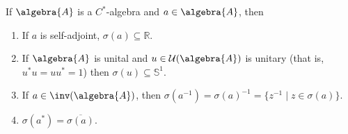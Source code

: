 \documentclass[a4paper]{article}
\newcommand{\unitcircle}{\mathds{S}^1}
\begin{document}
\begin{lemma}
	If $\algebra{A}$ is a $C^*$-algebra and $a \in \algebra{A}$, then 
	\begin{enumerate}
		\item If $a$ is self-adjoint, $\sigma(a) \subseteq \mathds{R}$.
		\item If $\algebra{A}$ is unital and $u \in \mathcal{U}(\algebra{A})$ is unitary (that is, $u^* u = u u^* = 1$) then $\sigma(u) \subseteq \unitcircle$.
		\item If $a \in \inv(\algebra{A})$, then $\sigma(a^{-1}) = \sigma(a)^{-1} = \{z^{-1} \mid z \in \sigma(a) \}$.
		\item $\sigma(a^*) = \overline{\sigma(a)}$.
	\end{enumerate}
\end{lemma}
\end{document}
